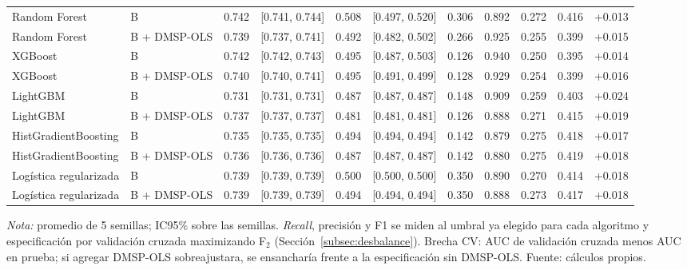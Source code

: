 \begin{table}[H]
{\begin{tabular}{llccccccccc}
    Random Forest            & B               & 0.742 & [0.741, 0.744] & 0.508 & [0.497, 0.520] & 0.306 & 0.892 & 0.272 & 0.416 & +0.013 \\
    Random Forest            & B + DMSP-OLS    & 0.739 & [0.737, 0.741] & 0.492 & [0.482, 0.502] & 0.266 & 0.925 & 0.255 & 0.399 & +0.015 \\
    \addlinespace
    XGBoost                  & B               & 0.742 & [0.742, 0.743] & 0.495 & [0.487, 0.503] & 0.126 & 0.940 & 0.250 & 0.395 & +0.014 \\
    XGBoost                  & B + DMSP-OLS    & 0.740 & [0.740, 0.741] & 0.495 & [0.491, 0.499] & 0.128 & 0.929 & 0.254 & 0.399 & +0.016 \\
    \addlinespace
    LightGBM                 & B               & 0.731 & [0.731, 0.731] & 0.487 & [0.487, 0.487] & 0.148 & 0.909 & 0.259 & 0.403 & +0.024 \\
    LightGBM                 & B + DMSP-OLS    & 0.737 & [0.737, 0.737] & 0.481 & [0.481, 0.481] & 0.126 & 0.888 & 0.271 & 0.415 & +0.019 \\
    \addlinespace
    HistGradientBoosting     & B               & 0.735 & [0.735, 0.735] & 0.494 & [0.494, 0.494] & 0.142 & 0.879 & 0.275 & 0.418 & +0.017 \\
    HistGradientBoosting     & B + DMSP-OLS    & 0.736 & [0.736, 0.736] & 0.487 & [0.487, 0.487] & 0.142 & 0.880 & 0.275 & 0.419 & +0.018 \\
    \addlinespace
    Logística regularizada   & B               & 0.739 & [0.739, 0.739] & 0.500 & [0.500, 0.500] & 0.350 & 0.890 & 0.270 & 0.414 & +0.018 \\
    Logística regularizada   & B + DMSP-OLS    & 0.739 & [0.739, 0.739] & 0.494 & [0.494, 0.494] & 0.350 & 0.888 & 0.273 & 0.417 & +0.018 \\
    \bottomrule
  \end{tabular}%
  }
  \begin{minipage}{0.95\textwidth}
    \vspace{4pt}
    \footnotesize \textit{Nota:} promedio de 5 semillas; IC95\% sobre
    las semillas. \emph{Recall}, precisión y F1 se miden al umbral ya
    elegido para cada algoritmo y especificación por validación cruzada
    maximizando F$_2$ (Sección~\ref{subsec:desbalance}). Brecha CV: AUC
    de validación cruzada menos AUC en prueba; si agregar DMSP-OLS
    sobreajustara, se ensancharía frente a la especificación sin
    DMSP-OLS. Fuente: cálculos propios.
  \end{minipage}
\end{table}